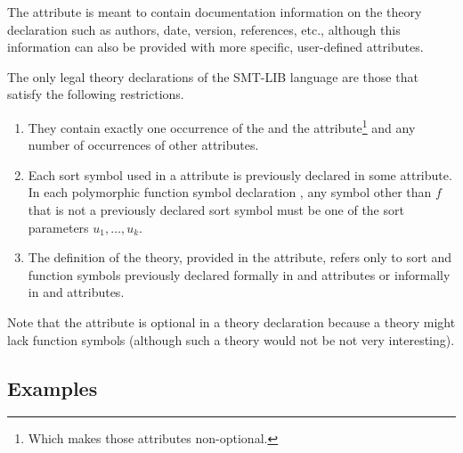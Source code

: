 The attribute  is meant 
to contain documentation information on the theory declaration 
such as authors, date, version, references, etc.,
although this information can also be provided 
with more specific, user-defined attributes.

\begin{constraint}
\label{def:theory}
The only legal theory declarations of the SMT-LIB language are those 
that satisfy the following restrictions.
\begin{enumerate}
\item
They contain exactly one occurrence of the  and 
the  attribute\footnote{%
Which makes those attributes non-optional.
}
and any number of occurrences of other attributes.

\item
Each sort symbol used in a  attribute is 
previously declared in some  attribute.
In each polymorphic function symbol declaration
,
any symbol other than $f$ that is not a previously declared sort symbol
must be one of the sort parameters $u_1, \ldots, u_k$. 

\item
The definition of the theory, provided in the  attribute,
refers only to sort and function symbols previously declared formally
in  and  attributes or 
informally in  and  attributes.

\end{enumerate}
\end{constraint}

Note that the  attribute is optional in a theory declaration
because a theory might lack function symbols (although 
such a theory would not be not very interesting).


\subsection{Examples} \label{sec:theory-examples}

